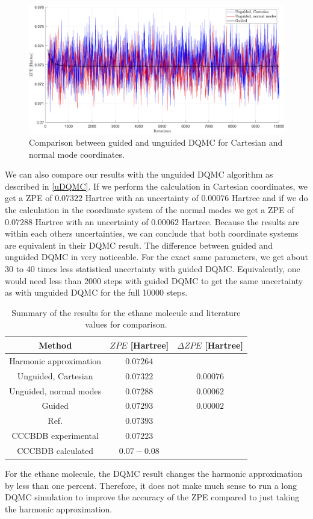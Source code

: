 \documentclass [12pt]{report}
\begin{document}
\begin{figure}[h!]
\includegraphics[width=\linewidth] {c2h6_2.png}
\caption{Comparison between guided and unguided DQMC for Cartesian and normal mode coordinates.} \label{c2h6_2}
\end{figure}
We can also compare our results with the unguided DQMC algorithm as described in \ref{uDQMC}. If we perform the calculation in Cartesian coordinates, we get a ZPE of $0.07322$ Hartree with an uncertainty of $0.00076$ Hartree and if we do the calculation in the coordinate system of the normal modes we get a ZPE of $0.07288$ Hartree with an uncertainty of $0.00062$ Hartree. Because the results are within each others uncertainties, we can conclude that both coordinate systems are equivalent in their DQMC result. The difference between guided and unguided DQMC in very noticeable. For the exact same parameters, we get about 30 to 40 times less statistical uncertainty with guided DQMC. Equivalently, one would need less than 2000 steps with guided DQMC to get the same uncertainty as with unguided DQMC for the full 10000 steps.

\begin{table}[h]
\centering
 \begin{tabular}{||c | c | c||} 
 \hline
 Method & $\overline{ZPE}$ [Hartree] & $\Delta ZPE$ [Hartree] \\ [0.5ex] 
 \hline\hline
 Harmonic approximation & $0.07264$ & \\
 \hline
 Unguided, Cartesian & $0.07322$ &  $0.00076$\\
  \hline
 Unguided, normal modes & $0.07288$ &  $0.00062$\\
 \hline
 Guided & $0.07293$ & $0.00002$ \\
 \hline
 Ref. \cite{c2h6} & $0.07393$ &\\
 \hline
 CCCBDB experimental \cite{cccbdb} & $0.07223$ & \\
 \hline
 CCCBDB calculated \cite{cccbdb} & $0.07 - 0.08$ & \\
 \hline
\end{tabular}
\caption{Summary of the results for the ethane molecule and literature values for comparison.}
\end{table}
For the ethane molecule, the DQMC result  changes the harmonic approximation by less than one percent. Therefore, it does not make much sense to run a long DQMC simulation to improve the accuracy of the ZPE compared to just taking the harmonic approximation.
\end{document}
